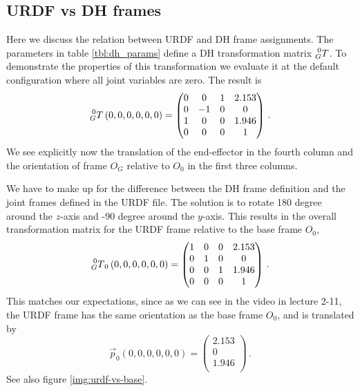 \documentclass[11pt, onecolumn, oneside, reqno]{article}
\begin{document}
{{\subsection{URDF vs DH frames}
Here we discuss the relation between URDF and DH frame assignments. The parameters in table \ref{tbl:dh_params} define a DH transformation matrix $\prescript{0}{G} T$. To demonstrate the properties of this transformation we evaluate it at the default configuration where all joint variables are zero. The result is
\begin{equation}
\prescript{0}{G} T \left(0, 0, 0, 0, 0, 0\right) = 
\left(\begin{matrix}
0 &  0 & 1 & 2.153 \\
0 & -1 & 0 & 0     \\
1 &  0 & 0 & 1.946 \\
0 &  0 & 0 & 1
\end{matrix}\right) \, .
\end{equation}
We see explicitly now the translation of the end-effector in the fourth column and the orientation of frame $O_G$ relative to $O_0$ in the first three columns.

We have to make up for the difference between the DH frame definition and the joint frames defined in the URDF file. The solution is to rotate 180 degree around the $z$-axis and -90 degree around the $y$-axis. This results in the overall transformation matrix for the URDF frame relative to the base frame $O_0$,
\begin{equation}
\prescript{0}{G} T_0 \left(0, 0, 0, 0, 0, 0\right) = 
\left(\begin{matrix}
1 & 0 & 0 & 2.153 \\
0 & 1 & 0 & 0     \\
0 & 0 & 1 & 1.946 \\
0 & 0 & 0 & 1
\end{matrix}\right) \, .
\end{equation}
This matches our expectations, since as we can see in the video in lecture 2-11, the URDF frame has the same orientation as the base frame $O_0$, and is translated by
\begin{equation}
\vec{p}_0 \left(0, 0, 0, 0, 0, 0\right) =
\left(\begin{matrix}
2.153 \\
0     \\
1.946 \\
\end{matrix}\right) \, .
\end{equation}
See also figure \ref{img:urdf-vs-base}.

}}
\end{document}
